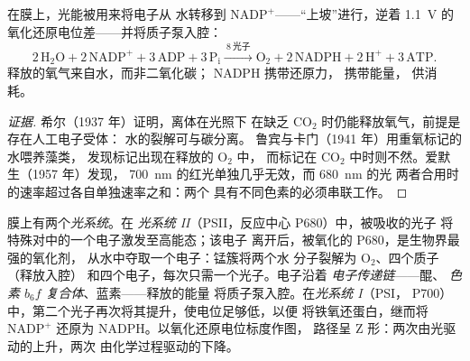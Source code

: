 \begin{proposition}[光反应的作用]\label{prop:b1:photosynthesis:lightreactions}
在膜上，光能被用来将电子从
水转移到 $\mathrm{NADP^+}$——“上坡”进行，逆着
\qty{1.1}{V} 的氧化还原电位差——并将质子泵入腔：
\[
2\,\mathrm{H_2O} + 2\,\mathrm{NADP^+} + 3\,\mathrm{ADP} + 3\,\mathrm{P_i}
\xrightarrow{\ 8\ \text{光子}\ }
\mathrm{O_2} + 2\,\mathrm{NADPH} + 2\,\mathrm{H^+} + 3\,\mathrm{ATP} .
\]
释放的氧气来自水，而非二氧化碳；
NADPH 携带还原力， 携带能量，
供消耗。
\end{proposition}
\begin{proof}[证据]
希尔（1937 年）证明，离体在光照下
在缺乏 $\mathrm{CO_2}$ 时仍能释放氧气，前提是存在人工电子受体：
水的裂解可与碳分离。
鲁宾与卡门（1941 年）用重氧标记的水喂养藻类，
发现标记出现在释放的 $\mathrm{O_2}$ 中，
而标记在 $\mathrm{CO_2}$ 中时则不然。爱默生（1957 年）发现，
\qty{700}{nm} 的红光单独几乎无效，而 \qty{680}{nm} 的光
两者合用时的速率超过各自单独速率之和：两个
具有不同色素的必须串联工作。
\end{proof}

\begin{definition}[光系统与 Z 方案]\label{def:b1:photosynthesis:zscheme}
膜上有两个\emph{光系统}。在
\emph{光系统 II}（PSII，反应中心 P680）中，被吸收的光子
将特殊对中的一个电子激发至高能态；该电子
离开后，被氧化的 P680，是生物界最强的氧化剂，
从水中夺取一个电子：锰簇将两个水
分子裂解为 $\mathrm{O_2}$、四个质子（释放入腔）
和四个电子，每次只需一个光子。电子沿着
\emph{电子传递链}——醌、
\emph{色素 $b_6f$ 复合体}、蓝素——释放的能量
将质子泵入腔。在\emph{光系统 I}（PSI，
P700）中，第二个光子再次将其提升，使电位足够低，以便
将铁氧还蛋白，继而将 $\mathrm{NADP^+}$ 还原为 NADPH。以氧化还原电位标度作图，
路径呈 Z 形：两次由光驱动的上升，两次
由化学过程驱动的下降。
\end{definition}

